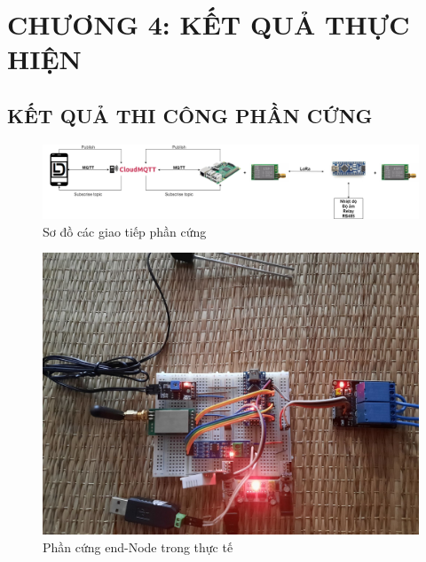 \section*{CHƯƠNG 4: KẾT QUẢ THỰC HIỆN}
\setcounter{section}{4}
\setcounter{figure}{0}
\setcounter{subsection}{0}
\subsection{KẾT QUẢ THI CÔNG PHẦN CỨNG}
\begin{figure}[H]
	\centering
	\includegraphics[scale=0.2]{Chapter 4/image chapter 4/figure.png}
	\caption[Sơ đồ các giao tiếp phần cứng]{Sơ đồ các giao tiếp phần cứng}
	\label{hinh41}
\end{figure}
\begin{figure}[H]
	\centering
	\includegraphics[scale=0.2]{Chapter 4/image chapter 4/phancung.jpg}
	\caption[Phần cứng end-Node trong thực tế]{Phần cứng end-Node trong thực tế}
	\label{hinh42}
\end{figure}
